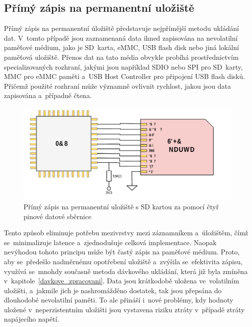 \subsection{Přímý zápis na permanentní uložiště}
Přímý zápis na permanentní úložiště představuje nejpřímější metodu ukládání dat. V~tomto případě jsou zaznamenaná data ihned zapisována na nevolatilní paměťové médium, jako je SD~karta, eMMC, USB flash disk nebo jiná lokální paměťová uložiště. Přenos dat na tato média obvykle probíhá prostřednictvím specializovaných rozhraní, jakými jsou například SDIO nebo SPI pro SD~karty, MMC pro eMMC paměti a~USB Host Controller pro připojení USB flash disků. Přičemž použité rozhraní může významně ovlivnit rychlost, jakou jsou data zapisována a~případně čtena.~\cite{datalogger_sd_mmc_usb_flash_disk}

\begin{figure}[h]
    \centering
    \includegraphics[width=1.00\textwidth]{obrazky-figures/forward_write.pdf}
    
    \caption{Přímý zápis na permanentní uložiště s SD kartou za pomocí čtyř pinové datové sběrnice}
    \label{fig:forward-write}
\end{figure}

Tento způsob eliminuje potřebu mezivrstvy mezi záznamníkem a~úložištěm, čímž se~minimalizuje latence a~zjednodušuje celková implementace. Naopak nevýhodou tohoto principu může být častý zápis na paměťové médium. Proto, aby se~předešlo nadměrnému opotřebení uložiště a~zvýšila se~efektivita zápisu, využívá se~mnohdy současně metoda dávkového ukládání, která již byla zmíněna v~kapitole~\ref{davkove_zpracovani}. Data jsou krátkodobě uložena ve~volatilním uložišti, a~jakmile jich je nashromážděno dostatek, tak jsou přepsána do dlouhodobé nevolatilní paměti. To ale přináší i~nové problémy, kdy hodnoty uložené v~neperzistentním uložišti jsou vystavena riziku ztráty v~případě ztráty napájecího napětí.~\cite{ieee_digital_sound_recorder_arm_sd_card}

